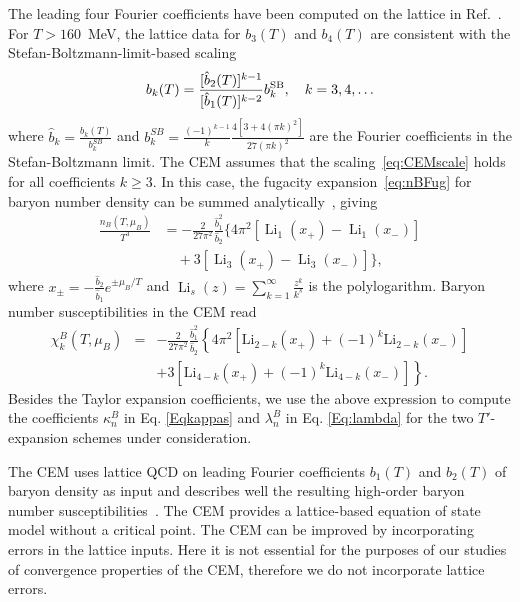 \documentclass[%
 reprint,
nofootinbib,
 amsmath,amssymb,
 aps,
prc
]{revtex4-2}
\begin{document}
The leading four Fourier coefficients have been computed on the lattice in Ref.~\cite{Vovchenko:2017xad}.
For $T > 160$~MeV, the lattice data for $b_3(T)$ and $b_4(T)$ are consistent with the Stefan-Boltzmann-limit-based scaling
\begin{align}
\label{eq:CEMscale}
b_k(T) = \frac{[\hat{b}_2(T)]^{k-1}}{[\hat{b}_1(T)]^{k-2}} b_k^{\rm SB}, \quad k = 3,4, \ldots
\end{align} 
where $\hat{b}_{k} = \frac{b_{k}(T)}{b_{k}^{SB}}$ and $b_k^{SB} = \frac{(-1)^{k-1}}{k}\frac{4[3+4(\pi k)^2]}{27(\pi k)^2}$ are the Fourier coefficients in the Stefan-Boltzmann limit.
The CEM assumes that the scaling~\eqref{eq:CEMscale} holds for all coefficients $k \geq 3$.
In this case, the fugacity expansion~\eqref{eq:nBFug} for baryon number density can be summed analytically~\cite{Vovchenko:2018zgt}, giving
\begin{align}\nonumber
    \frac{n_B(T,\mu_B)}{T^3} &= -\frac{2}{27\pi^2}\frac{\hat{b}_1^2}{\hat{b}_2}\{4\pi^2[\operatorname{Li}_1(x_+) - \operatorname{Li}_1(x_{-}  )] \\ 
    & \quad +  3[\operatorname{Li}_3(x_+) -\operatorname{Li}_3(x_-)]\},  \label{Eq:nBCEM}
\end{align}
where 
$x_\pm = -\frac{\hat{b}_2}{\hat{b}_1}e^{\pm \mu_B/T}$ and $\operatorname{Li}_s(z) = \sum_{k=1}^\infty \frac{z^k}{k^s}$ is the polylogarithm.
Baryon number susceptibilities in the CEM read
%
\begin{eqnarray}
    \chi_k^B(T,\mu_B) &=& -\frac{2}{27 \pi^2} \frac{\hat{b}_1^2}{\hat{b}_2} \left\{ 4\pi^2 \left[ \text{Li}_{2-k}(x_{+}) + (-1)^k \text{Li}_{2-k}(x_{-}) \right]  \right.\nonumber \\
    && \left. + 3 \left[ \text{Li}_{4-k}(x_{+}) + (-1)^k \text{Li}_{4-k}(x_{-}) \right] \right\}.
\end{eqnarray}
Besides the Taylor expansion coefficients, we use the above expression to compute the coefficients  $\kappa_n^B$  in Eq. \eqref{Eqkappas} and $\lambda_n^B$  in Eq. \eqref{Eq:lambda} for the two $T'$-expansion schemes under consideration.

The CEM uses lattice QCD on leading Fourier coefficients $b_1(T)$ and $b_2(T)$ of baryon density as input and describes well the resulting high-order baryon number susceptibilities~\cite{Vovchenko:2017gkg}.
The CEM provides a lattice-based equation of state model without a critical point. The CEM can be improved by incorporating errors in the lattice inputs.
Here it is not essential for the purposes of our studies of convergence properties of the CEM, therefore we do not incorporate lattice errors.
\end{document}
